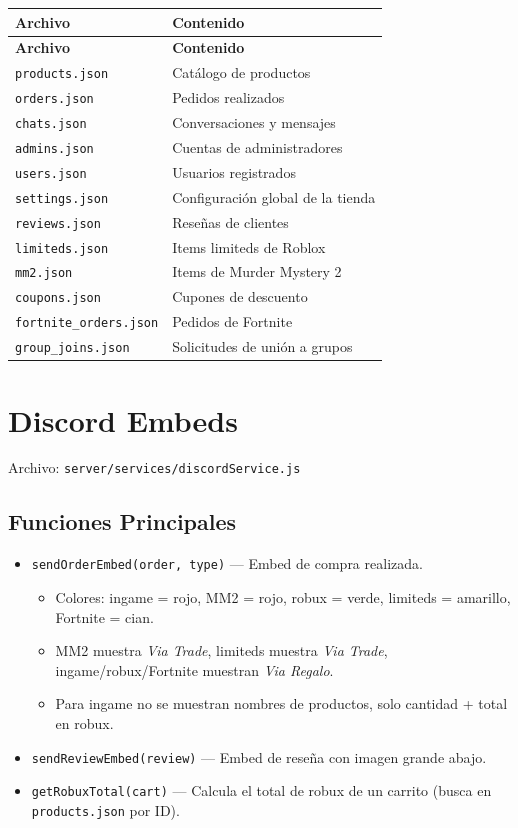 \documentclass[12pt,a4paper]{article}
\begin{document}
\begin{longtable}{|l|l|}
\hline
\textbf{Archivo} & \textbf{Contenido} \\ \hline
\endfirsthead
\hline
\textbf{Archivo} & \textbf{Contenido} \\ \hline
\endhead
\texttt{products.json} & Catálogo de productos \\ \hline
\texttt{orders.json} & Pedidos realizados \\ \hline
\texttt{chats.json} & Conversaciones y mensajes \\ \hline
\texttt{admins.json} & Cuentas de administradores \\ \hline
\texttt{users.json} & Usuarios registrados \\ \hline
\texttt{settings.json} & Configuración global de la tienda \\ \hline
\texttt{reviews.json} & Reseñas de clientes \\ \hline
\texttt{limiteds.json} & Items limiteds de Roblox \\ \hline
\texttt{mm2.json} & Items de Murder Mystery 2 \\ \hline
\texttt{coupons.json} & Cupones de descuento \\ \hline
\texttt{fortnite\_orders.json} & Pedidos de Fortnite \\ \hline
\texttt{group\_joins.json} & Solicitudes de unión a grupos \\ \hline
\end{longtable}

\newpage

\section{Discord Embeds}

Archivo: \texttt{server/services/discordService.js}

\subsection{Funciones Principales}

\begin{itemize}
  \item \texttt{sendOrderEmbed(order, type)} --- Embed de compra realizada.
    \begin{itemize}
      \item Colores: ingame = rojo, MM2 = rojo, robux = verde, limiteds = amarillo, Fortnite = cian.
      \item MM2 muestra \textit{Via Trade}, limiteds muestra \textit{Via Trade}, ingame/robux/Fortnite muestran \textit{Via Regalo}.
      \item Para ingame no se muestran nombres de productos, solo cantidad + total en robux.
    \end{itemize}
  \item \texttt{sendReviewEmbed(review)} --- Embed de reseña con imagen grande abajo.
  \item \texttt{getRobuxTotal(cart)} --- Calcula el total de robux de un carrito (busca en \texttt{products.json} por ID).
\end{itemize}
\end{document}
